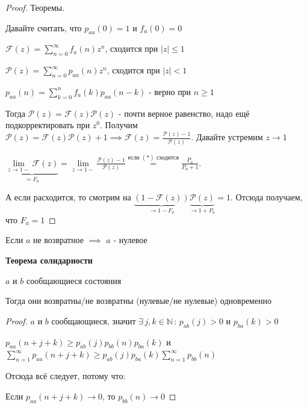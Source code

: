 \begin{proof}
    Теоремы.

    Давайте считать, что $p_{aa} (0) = 1$ и $f_a (0) = 0$

    $\mathcal{F} (z) = \sum_{n=0}^{\infty} f_a (n) z^n$, сходится при $|z| \leqslant 1$

    $\mathcal{P} (z) = \sum_{n=0}^{\infty} p_{aa} (n)z^n$, сходится при $|z| < 1$

    $p_{aa} (n) = \sum_{k = 0}^{n} f_a (k) p_{aa} (n - k)$ - верно при $n \geqslant 1$

    Тогда $\mathcal{P} (z) = \mathcal{F} (z) \mathcal{P} (z)$ - почти верное равенство, надо ещё подкорректировать при $z^0$.
    Получим $\mathcal{P} (z) = \mathcal{F} (z) \mathcal{P} (z) + 1 \implies \mathcal{F} (z) = \frac{\mathcal{P} (z) - 1}{\mathcal{P} (z)}$. Давайте устремим $z \to 1$
    
    $\underbrace{\lim\limits_{z \to 1-} \mathcal{F} (z)}_{=F_a} = \lim\limits_{z \to 1-} \frac{\mathcal{P} (z) - 1}{\mathcal{P} (z)} \overset{\text{если $(*)$ сходится}}{=} \frac{P_a}{P_a + 1}$.

    А если расходится, то смотрим на $\underbrace{(1 - \mathcal{F} (z))}_{\to 1 - F_a} \underbrace{\mathcal{P} (z)}_{\to 1 + P_a} = 1$. Отсюда получаем, что $F_a = 1$
\end{proof}

\begin{consequence}
    Если $a$ не возвратное $\implies$ $a$ - нулевое
\end{consequence}

\begin{theorem}
    \textbf{Теорема солидарности}

    $a$ и $b$ сообщающиеся состояния

    Тогда они возвратны/не возвратны (нулевые/не нулевые) одновременно
\end{theorem}

\begin{proof}
    $a$ и $b$ сообщающиеся, значит $\exists \,  j, k \in \mathbb{N} \, : \, p_{ab} (j) > 0$ и $p_{ba} (k) > 0$

    $p_{aa} (n + j + k) \geqslant p_{ab} (j) p_{bb} (n) p_{ba} (k)$ и $\sum\limits_{n = 1}^\infty p_{aa} (n + j + k) \geqslant p_{ab} (j) p_{ba} (k) \sum\limits_{n = 1}^\infty p_{bb} (n)$

    Отсюда всё следует, потому что:

    Если $p_{aa} (n + j + k) \rightarrow 0$, то $p_{bb} (n) \rightarrow 0$
    
\end{proof}

